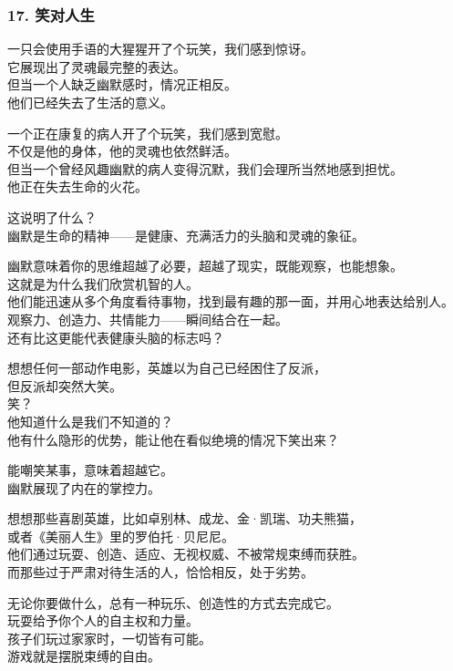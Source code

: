 \documentclass[
]{article}
\begin{document}
\subsubsection{17. 笑对人生}\label{17-ux7b11ux5bf9ux4ebaux751f}

一只会使用手语的大猩猩开了个玩笑，我们感到惊讶。\\
它展现出了灵魂最完整的表达。\\
但当一个人缺乏幽默感时，情况正相反。\\
他们已经失去了生活的意义。

一个正在康复的病人开了个玩笑，我们感到宽慰。\\
不仅是他的身体，他的灵魂也依然鲜活。\\
但当一个曾经风趣幽默的病人变得沉默，我们会理所当然地感到担忧。\\
他正在失去生命的火花。

这说明了什么？\\
幽默是生命的精神------是健康、充满活力的头脑和灵魂的象征。

幽默意味着你的思维超越了必要，超越了现实，既能观察，也能想象。\\
这就是为什么我们欣赏机智的人。\\
他们能迅速从多个角度看待事物，找到最有趣的那一面，并用心地表达给别人。\\
观察力、创造力、共情能力------瞬间结合在一起。\\
还有比这更能代表健康头脑的标志吗？

想想任何一部动作电影，英雄以为自己已经困住了反派，\\
但反派却突然大笑。\\
笑？\\
他知道什么是我们不知道的？\\
他有什么隐形的优势，能让他在看似绝境的情况下笑出来？

能嘲笑某事，意味着超越它。\\
幽默展现了内在的掌控力。

想想那些喜剧英雄，比如卓别林、成龙、金·凯瑞、功夫熊猫，\\
或者《美丽人生》里的罗伯托·贝尼尼。\\
他们通过玩耍、创造、适应、无视权威、不被常规束缚而获胜。\\
而那些过于严肃对待生活的人，恰恰相反，处于劣势。

无论你要做什么，总有一种玩乐、创造性的方式去完成它。\\
玩耍给予你个人的自主权和力量。\\
孩子们玩过家家时，一切皆有可能。\\
游戏就是摆脱束缚的自由。
\end{document}
